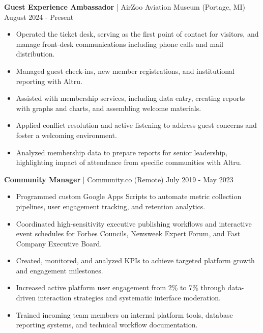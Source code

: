 \documentclass[10pt,letterpaper]{article}
\begin{document}
\textbf{Guest Experience Ambassador} | AirZoo Aviation Museum (Portage, MI) \hfill August 2024 - Present
\begin{itemize}
    \item Operated the ticket desk, serving as the first point of contact for visitors, and manage front-desk communications including phone calls and mail distribution.
    \item Managed guest check-ins, new member registrations, and institutional reporting with Altru. 
    \item Assisted with membership services, including data entry, creating reports with graphs and charts, and assembling welcome materials.
    \item Applied conflict resolution and active listening to address guest concerns and foster a welcoming environment.
    \item Analyzed membership data to prepare reports for senior leadership, highlighting impact of attendance from specific communities with Altru.
\end{itemize}

\textbf{Community Manager} | Community.co (Remote) \hfill July 2019 - May 2023
\begin{itemize}
    \item Programmed custom Google Apps Scripts to automate metric collection pipelines, user engagement tracking, and retention analytics.
    \item Coordinated high-sensitivity executive publishing workflows and interactive event schedules for Forbes Councils, Newsweek Expert Forum, and Fast Company Executive Board.
    \item Created, monitored, and analyzed KPIs to achieve targeted platform growth and engagement milestones.
    \item Increased active platform user engagement from 2\% to 7\% through data-driven interaction strategies and systematic interface moderation.
    \item Trained incoming team members on internal platform tools, database reporting systems, and technical workflow documentation.
\end{itemize}
\end{document}
